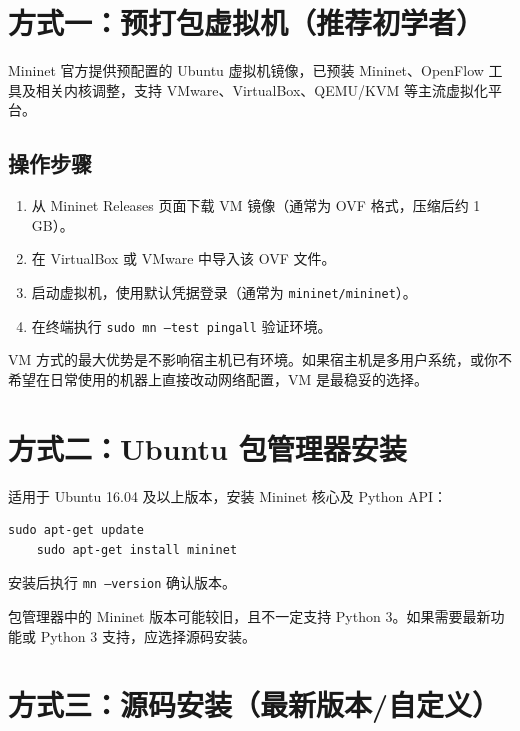 \documentclass[12pt,a4paper,openany]{ctexbook}
\begin{document}
\section{方式一：预打包虚拟机（推荐初学者）}

Mininet 官方提供预配置的 Ubuntu 虚拟机镜像，已预装 Mininet、OpenFlow 工具及相关内核调整，支持 VMware、VirtualBox、QEMU/KVM 等主流虚拟化平台。

\subsection{操作步骤}

\begin{enumerate}[leftmargin=*]
	\item 从 Mininet Releases 页面下载 VM 镜像（通常为 OVF 格式，压缩后约 1 GB）。
	\item 在 VirtualBox 或 VMware 中导入该 OVF 文件。
	\item 启动虚拟机，使用默认凭据登录（通常为 \texttt{mininet/mininet}）。
	\item 在终端执行 \texttt{sudo mn --test pingall} 验证环境。
\end{enumerate}

\begin{tipbox}
	VM 方式的最大优势是不影响宿主机已有环境。如果宿主机是多用户系统，或你不希望在日常使用的机器上直接改动网络配置，VM 是最稳妥的选择。
\end{tipbox}

\section{方式二：Ubuntu 包管理器安装}

适用于 Ubuntu 16.04 及以上版本，安装 Mininet 核心及 Python API：

\begin{lstlisting}[style=bashstyle]
	sudo apt-get update
	sudo apt-get install mininet
\end{lstlisting}

安装后执行 \texttt{mn --version} 确认版本。

\begin{warnbox}
	包管理器中的 Mininet 版本可能较旧，且不一定支持 Python 3。如果需要最新功能或 Python 3 支持，应选择源码安装。
\end{warnbox}

\section{方式三：源码安装（最新版本/自定义）}
\end{document}

